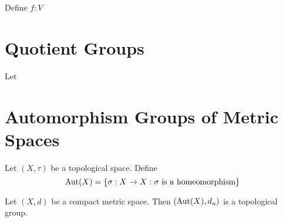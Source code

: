 \documentclass{book}
\begin{document}
	\begin{ex}
		Define $f: V$
	\end{ex}
	
	
	
	
	
	
	
	
	
	
	
	
	
	
	
	
	
	
	
	
	
	
	
	
	
	
	
		\section{Quotient Groups}
	\begin{defn}
		Let 
	\end{defn}
	
	
	
	
	
	
	
	
	
	
	
	
	
	
	
	
	
	
	
	
	
	\newpage
	\section{Automorphism Groups of Metric Spaces}
	
	\begin{defn} \ld{}
	Let $(X, \tau)$ be a topological space. Define $$\operatorname{Aut}(X) = \{\sigma:X\rightarrow X: \sigma \text{ is a homeomorphism} \}$$ 
	\end{defn}	
	
	\begin{ex} \lex{}
	Let $(X, d)$ be a compact metric space. Then $(\operatorname{Aut}(X), d_{u} )$ is a topological group.
	\end{ex}
	
\end{document}
